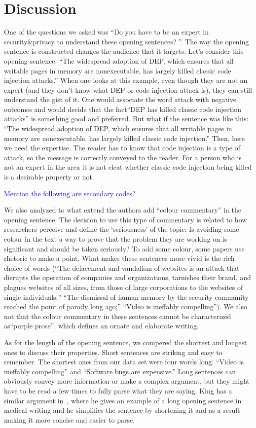 \documentclass[sigconf,anonymous]{acmart}
\newcommand{\textblue}[1]{\textcolor{blue}{#1}}
\begin{document}
	\section{Discussion}
One of the questions we asked was ``Do you have to be an expert in security\&privacy to understand these opening sentences? ''. The way the opening sentence is constructed changes the audience that it targets. Let's consider this opening sentence: ``The widespread adoption of DEP, which ensures that all writable pages in memory are nonexecutable, has largely killed classic code injection attacks.'' When one looks at this example, even though they are not an expert (and they don't know what DEP or code injection attack is), they can still understand the gist of it. One would associate the word attack with negative outcomes and would decide that the fact``DEP has killed classic code injection attacks'' is something good and preferred. But what if the sentence was like this: ``The widespread adoption of DEP, which ensures that all writable pages in memory are nonexecutable, has largely killed classic code injection.'' Then, here we need the expertise. The reader has to know that code injection is a type of attack, so the message is correctly conveyed to the reader. For a person who is not an expert in the area it is not cleat whether classic code injection being killed is a desirable property or not.


\textblue{Mention the following are secondary codes?}

We also analyzed to what extend the authors add ``colour commentary'' in the opening sentence. The decision to use this type of commentary is related to how researchers perceive and define the `seriousness' of the topic: Is avoiding some colour in the text a way to prove that the problem they are working on is significant and should be taken seriously? To add some colour, some papers use rhetoric to make a point. What makes these sentences more vivid is the rich choice of words (``The defacement and vandalism of websites is an attack that disrupts the operation of companies and organizations, tarnishes their brand, and plagues websites of all sizes, from those of large corporations to the websites of single individuals;'' ``The dismissal of human memory by the security community reached the point of parody long ago;'' ``Video is ineffably compelling''). We also not that the colour commentary in these sentences cannot be characterized as``purple prose'', which defines an ornate and elaborate writing. 

As for the length of the opening sentence, we compered the shortest and longest ones to discuss their properties. Short sentences are striking and easy to remember. The shortest ones from our data set were four words long: ``Video is ineffably compelling'' and ``Software bugs are expensive.'' Long sentences can obviously convey more information or make a complex argument, but they might have to be read a few times to fully parse what they are saying. King has a similar argument in~\cite{king1967opening}, where he gives an example of a long opening sentence in medical writing and he simplifies the sentence by shortening it and as a result making it more concise and easier to parse.
\end{document}
